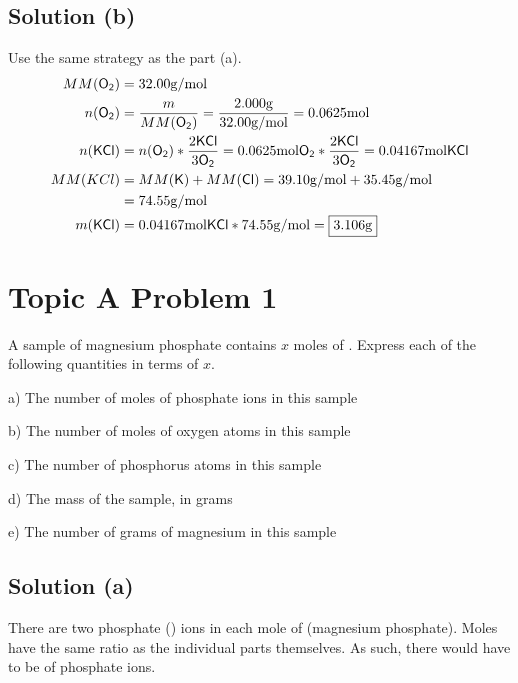 \documentclass[10pt]{article}
\begin{document}
        \subsection{Solution (b)}
            Use the same strategy as the part (a).
            \begin{align}
                MM(\ce{O2}) &=  32.00 \unit{\gram/\mole}\\
                n(\ce{O2})  &=  \frac{m}{MM(\ce{O2})}
                    =   \frac{2.000 \unit{\gram}}{32.00 \unit{\gram/\mole}}
                    =   0.0625 \unit{\mole}\\
                n(\ce{KCl}) &=  n(\ce{O2}) * \frac{2 \ce{KCl}}{3 \ce{O2}}
                    =   0.0625 \unit{\mole} \ce{O2} * \frac{2 \ce{KCl}}{3\ce{O2}}
                    =   0.04167 \unit{\mole} \ce{KCl}\\
                MM(KCl) &=  MM(\ce{K}) + MM(\ce{Cl})
                    =   39.10 \unit{\gram/\mole} + 35.45 \unit{\gram/\mole}\\
                    &=  74.55 \unit{\gram/\mole}\\
                m(\ce{KCl}) &=  0.04167 \unit{\mole} \ce{KCl} * 74.55 \unit{\gram/\mole}
                    =   \boxed{3.106 \unit{\gram}}
            \end{align}

    \pagebreak
    \section{Topic A Problem 1}
        A sample of magnesium phosphate contains $x$ moles of .
        Express each of the following quantities in terms of $x$.

        a) The number of moles of phosphate ions in this sample
        
        b) The number of moles of oxygen atoms in this sample

        c) The number of phosphorus atoms in this sample

        d) The mass of the sample, in grams

        e) The number of grams of magnesium in this sample

        \subsection{Solution (a)}
            There are two phosphate () ions in each mole of  (magnesium phosphate). 
            Moles have the same ratio as the individual parts themselves. 
            As such, there would have to be  of phosphate ions.
\end{document}

